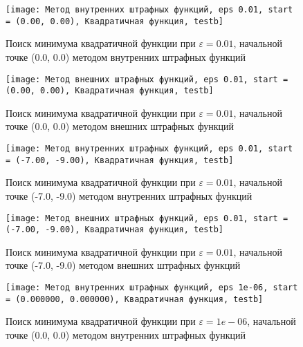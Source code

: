 \begin{table}[H]
\begin{tabular}{|c|c|c|c|}
\end{tabular}
\end{table}


            \begin{figure}[H]
	        \centering
	        \texttt{[image: Метод внутренних штрафных функций, eps 0.01, start = (0.00, 0.00), Квадратичная функция, testb]}%
	        \caption{Поиск минимума квадратичной функции при $\varepsilon = 0.01$, начальной точке (0.0, 0.0) методом внутренних штрафных функций}
	        \vspace*{-1.2cm}
            \end{figure}
            
            \begin{figure}[H]
	        \centering
	        \texttt{[image: Метод внешних штрафных функций, eps 0.01, start = (0.00, 0.00), Квадратичная функция, testb]}%
	        \caption{Поиск минимума квадратичной функции при $\varepsilon = 0.01$, начальной точке (0.0, 0.0) методом внешних штрафных функций}
	        \vspace*{-1.2cm}
            \end{figure}
            
            \begin{figure}[H]
	        \centering
	        \texttt{[image: Метод внутренних штрафных функций, eps 0.01, start = (-7.00, -9.00), Квадратичная функция, testb]}%
	        \caption{Поиск минимума квадратичной функции при $\varepsilon = 0.01$, начальной точке (-7.0, -9.0) методом внутренних штрафных функций}
	        \vspace*{-1.2cm}
            \end{figure}
            
            \begin{figure}[H]
	        \centering
	        \texttt{[image: Метод внешних штрафных функций, eps 0.01, start = (-7.00, -9.00), Квадратичная функция, testb]}%
	        \caption{Поиск минимума квадратичной функции при $\varepsilon = 0.01$, начальной точке (-7.0, -9.0) методом внешних штрафных функций}
	        \vspace*{-1.2cm}
            \end{figure}
            
            \begin{figure}[H]
	        \centering
	        \texttt{[image: Метод внутренних штрафных функций, eps 1e-06, start = (0.000000, 0.000000), Квадратичная функция, testb]}%
	        \caption{Поиск минимума квадратичной функции при $\varepsilon = 1e-06$, начальной точке (0.0, 0.0) методом внутренних штрафных функций}
	        \vspace*{-1.2cm}
            \end{figure}
            

